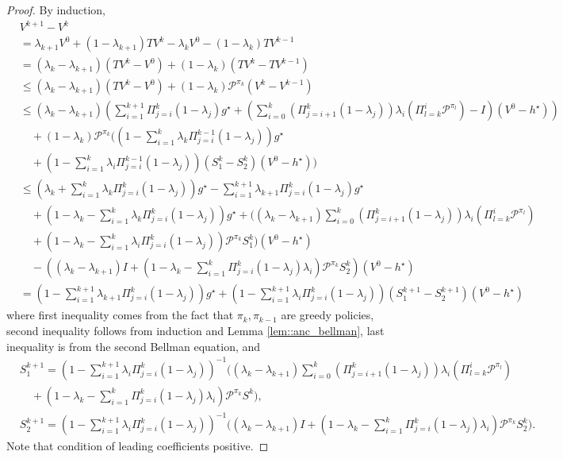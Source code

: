 \documentclass{article} %
\newcommand{\cP}{\mathcal{P}}
\newcommand*{\para}[1]{\left({#1}\right)}
\begin{document}
\begin{proof}
By induction, 
\begin{align*}
    &V^{k+1}-V^{k} 
    \\& = \lambda_{k+1} V^{0}+(1-\lambda_{k+1})TV^{k}-\lambda_{k} V^{0}-(1-\lambda_{k})TV^{k-1}
    \\ &= (\lambda_{k}-\lambda_{k+1})(TV^{k} -V^{0})+(1-\lambda_{k})(TV^{k} -TV^{k-1})
     \\ & \le (\lambda_{k}-\lambda_{k+1})(TV^{k} -V^{0})+(1-\lambda_{k})\cP^{\pi_{k}}(V^{k} -V^{k-1})
         \\ & \le (\lambda_{k}-\lambda_{k+1}) \para{ \sum_{i=1}^{k+1} \Pi^{k}_{j=i} (1-\lambda_j)g^{\star}  +\para{\sum_{i=0}^{k} (\Pi^k_{j=i+1} (1-\lambda_j)) \lambda_{i}\para{\Pi^{i}_{l=k}\cP^{\pi_l}}-I}(V^0-h^{\star})}
    \\& \quad + (1-\lambda_{k})\cP^{\pi_{k}}\Bigg(\para{1-\sum_{i=1}^{k} \lambda_k \Pi^{k-1}_{j=i} (1-\lambda_j)}g^{\star}
    \\& \quad + \para{1-\sum_{i=1}^{k} \lambda_i \Pi^{k-1}_{j=i} (1-\lambda_j)}(S^{k}_1 -S^{k}_2)(V^0-h^{\star})\Bigg)
             \\ & \le \para{\lambda_k+\sum_{i=1}^{k} \lambda_{k}\Pi^{k}_{j=i} (1-\lambda_j)}g^{\star}-\sum_{i=1}^{k+1} \lambda_{k+1}\Pi^{k}_{j=i} (1-\lambda_j)g^{\star}
             \\& \quad +\para{1-\lambda_k-\sum_{i=1}^{k} \lambda_k \Pi^{k}_{j=i} (1-\lambda_j)}g^{\star}+ \Bigg((\lambda_{k}-\lambda_{k+1})\sum_{i=0}^{k} (\Pi^k_{j=i+1} (1-\lambda_j)) \lambda_{i}\para{\Pi^{i}_{l=k}\cP^{\pi_l}}
             \\& \quad +\para{1-\lambda_k-\sum_{i=1}^{k} \lambda_i \Pi^{k}_{j=i} (1-\lambda_j)}\cP^{\pi_{k}}S^k_1\Bigg)(V^0-h^{\star})
    \\& \quad - \para{(\lambda_{k}-\lambda_{k+1})I+\para{1-\lambda_k-\sum_{i=1}^{k}  \Pi^{k}_{j=i} (1-\lambda_j)\lambda_i}\cP^{\pi_{k}}S^{k}_2}(V^0-h^{\star})
    \\& = \para{1-\sum_{i=1}^{k+1} \lambda_{k+1} \Pi^{k}_{j=i} (1-\lambda_j)}g^{\star} + \para{1-\sum_{i=1}^{k+1} \lambda_i \Pi^{k}_{j=i} (1-\lambda_j)}(S^{k+1}_1 -S^{k+1}_2)(V^0-h^{\star})
\end{align*}   
    where first inequality comes from the fact that $\pi_k, \pi_{k-1}$ are greedy policies, second inequality follows from induction and Lemma \ref{lem::anc_bellman}, last inequality is from the second Bellman equation, and 
    \begin{align*}
    & S^{k+1}_1 = \para{1-\sum_{i=1}^{k+1} \lambda_i \Pi^{k}_{j=i} (1-\lambda_j)}^{-1} \bigg((\lambda_{k}-\lambda_{k+1})\sum_{i=0}^{k} (\Pi^k_{j=i+1} (1-\lambda_j)) \lambda_{i}\para{\Pi^{i}_{l=k}\cP^{\pi_l}} 
    \\& \quad +\para{1-\lambda_k-\sum_{i=1}^{k}  \Pi^{k}_{j=i} (1-\lambda_j)\lambda_i}\cP^{\pi_{k}}S^k \bigg), 
    \\&S^{k+1}_2 =\para{1-\sum_{i=1}^{k+1} \lambda_i \Pi^{k}_{j=i} (1-\lambda_j)}^{-1}\bigg((\lambda_{k}-\lambda_{k+1})I+\para{1-\lambda_k-\sum_{i=1}^{k}  \Pi^{k}_{j=i} (1-\lambda_j)\lambda_i}\cP^{\pi_{k}}S^{k}_2 \bigg).    
    \end{align*}
     Note that condition of leading coefficients positive.
\end{proof}
\end{document}
